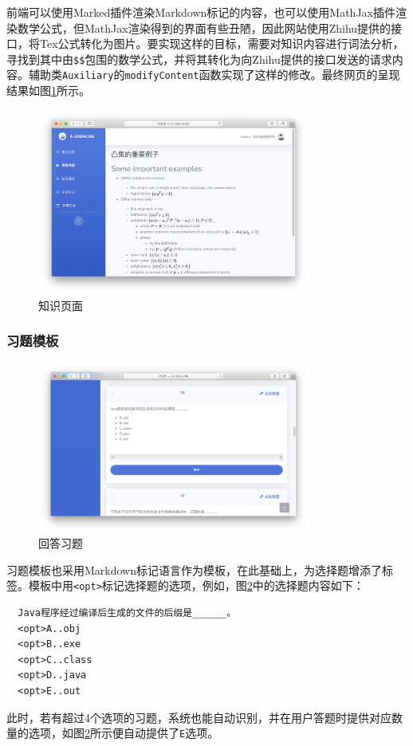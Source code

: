 \documentclass{nwafucoursepaper}
\begin{document}
前端可以使用Marked插件渲染Markdown标记的内容，也可以使用MathJax插件渲染数学公式，但MathJax渲染得到的界面有些丑陋，因此网站使用Zhihu提供的接口，将Tex公式转化为图片。要实现这样的目标，需要对知识内容进行词法分析，寻找到其中由\verb|$$|包围的数学公式，并将其转化为向Zhihu提供的接口发送的请求内容。辅助类\verb|Auxiliary|的\verb|modifyContent|函数实现了这样的修改。最终网页的呈现结果如图\ref{knowledge_math}所示。

\begin{figure}[htp]
  \centering
  \includegraphics[width=0.8\textwidth]{knowledge_math.png}
  \caption{知识页面}
  \label{knowledge_math}
\end{figure}

\subsubsection{习题模板}

\begin{figure}[htp]
  \centering
  \includegraphics[width=0.8\textwidth]{answer_exercise.png}
  \caption{回答习题}
  \label{answer_exercise}
\end{figure}

习题模板也采用Markdown标记语言作为模板，在此基础上，为选择题增添了标签。模板中用\verb|<opt>|标记选择题的选项，例如，图\ref{answer_exercise}中的选择题内容如下：
\begin{lstlisting}
  Java程序经过编译后生成的文件的后缀是______。
  <opt>A..obj
  <opt>B..exe
  <opt>C..class
  <opt>D..java
  <opt>E..out
\end{lstlisting}
此时，若有超过4个选项的习题，系统也能自动识别，并在用户答题时提供对应数量的选项，如图\ref{answer_exercise}所示便自动提供了\verb|E|选项。
\end{document}
